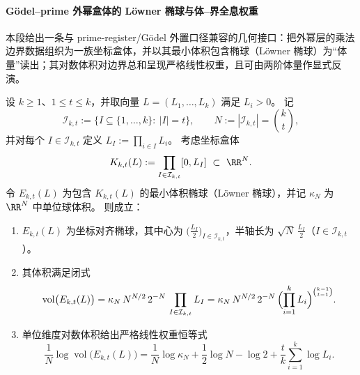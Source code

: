 \paragraph{Gödel--prime 外幂盒体的 Löwner 椭球与体--界全息权重}\label{par:xi-godel-loewner-exterior-volume-holography}
本段给出一条与 prime-register/Gödel 外置口径兼容的几何接口：把外幂层的乘法边界数据组织为一族坐标盒体，并以其最小体积包含椭球（Löwner 椭球）为“体量”读出；其对数体积对边界总和呈现严格线性权重，且可由两阶体量作显式反演。

\begin{theorem}\label{thm:xi-godel-loewner-exterior-box-loewner-holographic-weight}
设 \(k\ge 1\)、\(1\le t\le k\)，并取向量 \(L=(L_1,\dots,L_k)\) 满足 \(L_i>0\)。
记
\[
\mathcal I_{k,t}:=\{I\subseteq\{1,\dots,k\}:\ |I|=t\},
\qquad
N:=|\mathcal I_{k,t}|=\binom{k}{t},
\]
并对每个 \(I\in\mathcal I_{k,t}\) 定义 \(L_I:=\prod_{i\in I}L_i\)。
考虑坐标盒体
\[
K_{k,t}(L):=\prod_{I\in\mathcal I_{k,t}}[0,L_I]\ \subset\ \RR^{N}.
\]
令 \(E_{k,t}(L)\) 为包含 \(K_{k,t}(L)\) 的最小体积椭球（Löwner 椭球），并记 \(\kappa_N\) 为 \(\RR^N\) 中单位球体积。
则成立：
\begin{enumerate}
  \item \(E_{k,t}(L)\) 为坐标对齐椭球，其中心为 \(\bigl(\tfrac{L_I}{2}\bigr)_{I\in\mathcal I_{k,t}}\)，半轴长为 \(\sqrt N\,\tfrac{L_I}{2}\)（\(I\in\mathcal I_{k,t}\)）。
  \item 其体积满足闭式
  \[
  \operatorname{vol}\bigl(E_{k,t}(L)\bigr)
  =
  \kappa_N\,N^{N/2}\,2^{-N}\,\prod_{I\in\mathcal I_{k,t}}L_I
  =
  \kappa_N\,N^{N/2}\,2^{-N}\,
  \Bigl(\prod_{i=1}^{k}L_i\Bigr)^{\binom{k-1}{t-1}}.
  \]
  \item 单位维度对数体积给出严格线性权重恒等式
  \[
  \frac1N\log\operatorname{vol}\bigl(E_{k,t}(L)\bigr)
  =
  \frac1N\log\kappa_N+\frac12\log N-\log 2+\frac{t}{k}\sum_{i=1}^{k}\log L_i.
  \]
\end{enumerate}
\end{theorem}
